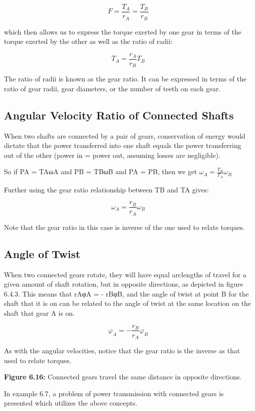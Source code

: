 \documentclass[
  letterpaper,
  DIV=11,
  numbers=noendperiod]{scrreprt}
\begin{document}
\[
F=\frac{T_A}{r_A}=\frac{T_B}{r_B}
\]

which then allows us to express the torque exerted by one gear in terms
of the torque exerted by the other as well as the ratio of radii:

\[
T_A=\frac{r_A}{r_B} T_B
\]

The ratio of radii is known as the gear ratio. It can be expressed in
terms of the ratio of gear radii, gear diameters, or the number of teeth
on each gear.

\subsection{Angular Velocity Ratio of Connected
Shafts}\label{angular-velocity-ratio-of-connected-shafts}

When two shafts are connected by a pair of gears, conservation of energy
would dictate that the power transferred into one shaft equals the power
transferring out of the other (power in = power out, assuming losses are
negligible).

So if PA = TAωA and PB = TBωB and PA = PB, then we get
\(\omega_A=\frac{T_B}{T_A} \omega_B\)

Further using the gear ratio relationship between TB and TA gives:

\[
\omega_A=\frac{r_B}{r_A} \omega_B
\]

Note that the gear ratio in this case is inverse of the one used to
relate torques.

\subsection{Angle of Twist}\label{angle-of-twist}

When two connected gears rotate, they will have equal arclengths of
travel for a given amount of shaft rotation, but in opposite directions,
as depicted in figure 6.4.3. This means that rAφA = - rBφB, and the
angle of twist at point B for the shaft that it is on can be related to
the angle of twist at the same location on the shaft that gear A is on.

\[
\varphi_A=-\frac{r_B}{r_A} \varphi_B
\]

As with the angular velocities, notice that the gear ratio is the
inverse as that used to relate torques.

\textbf{Figure 6.16:} Connected gears travel the same distance in
opposite directions.

In example 6.7, a problem of power transmission with connected gears is
presented which utilizes the above concepts.
\end{document}
